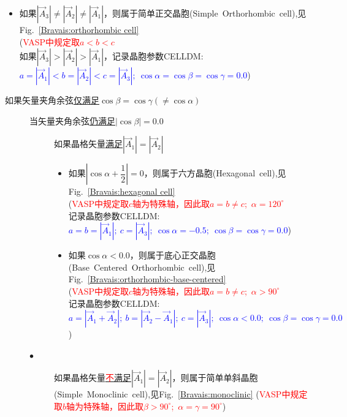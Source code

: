 \documentclass{article}      %
\begin{document}
\begin{description}
\begin{description}
\begin{itemize}
					\item 如果$|\vec A_3|\neq|\vec A_2|\neq|\vec A_1|$，则属于简单正交晶胞(\textrm{Simple~Orthorhombic~cell}),见\textrm{Fig.~}\ref{Bravais:orthorhombic cell}\\
						(\textcolor{red}{\textrm{VASP}中规定取$a<b<c$}\\
						如果$|\vec A_3|>|\vec A_2|>|\vec A_1|$，记录晶胞参数\textrm{CELLDM}:\\
						\textcolor{blue}{$a=|\vec A_1|<b=|\vec A_2|<c=|\vec A_3|;~\cos\alpha=\cos\beta=\cos\gamma=0.0$})
				\end{itemize}
		\end{description}
	\item[] 如果矢量夹角余弦\underline{仅满足}$\cos\beta=\cos\gamma(\neq\cos\alpha)$
		\begin{description}
			\item[] 当矢量夹角余弦\underline{仍满足}$|\cos\beta|=0.0$
			\begin{description}
				\item[] 如果晶格矢量\underline{满足}$|\vec A_1|=|\vec A_2|$
					\begin{itemize}
						\item 如果$|\cos\alpha+\dfrac12|=0$，则属于六方晶胞(\textrm{Hexagonal~cell}),见\textrm{Fig.~}\ref{Bravais:hexagonal cell}\\ 
							(\textcolor{red}{\textrm{VASP}中规定取$c$轴为特殊轴，因此取$a=b\neq c$;~$\alpha=120^{\circ}$}\\
							记录晶胞参数\textrm{CELLDM}:~\textcolor{blue}{$a=b=|\vec A_1|;~c=|\vec A_3|;~\cos\alpha=-0.5;~\cos\beta=\cos\gamma=0.0$})
						\item 如果$\cos\alpha<0.0$，则属于底心正交晶胞(\textrm{Base~Centered~Orthorhombic~cell}),见\textrm{Fig.~}\ref{Bravais:orthorhombic-base-centered}\\
							(\textcolor{red}{\textrm{VASP}中规定取$c$轴为特殊轴，因此取$a=b\neq c$;~$\alpha>90^{\circ}$}\\
							记录晶胞参数\textrm{CELLDM}:\\
							\textcolor{blue}{$a=|\vec A_1+\vec A_2|;~b=|\vec A_2-\vec A_1|;~c=|\vec A_3|;~\cos\alpha<0.0;~\cos\beta=\cos\gamma=0.0$})
					\end{itemize}
				\item[$\bullet$] 如果晶格矢量\underline{\textcolor{red}{不}满足}$|\vec A_1|=|\vec A_2|$，则属于简单单斜晶胞(\textrm{Simple~Monoclinic~cell}),见\textrm{Fig.~}\ref{Bravais:monoclinic}
					(\textcolor{red}{\textrm{VASP}中规定取$b$轴为特殊轴，因此取$\beta>90^{\circ}$;~$\alpha=\gamma=90^{\circ}$})

\end{description}
\end{description}
\end{description}
\end{document}
